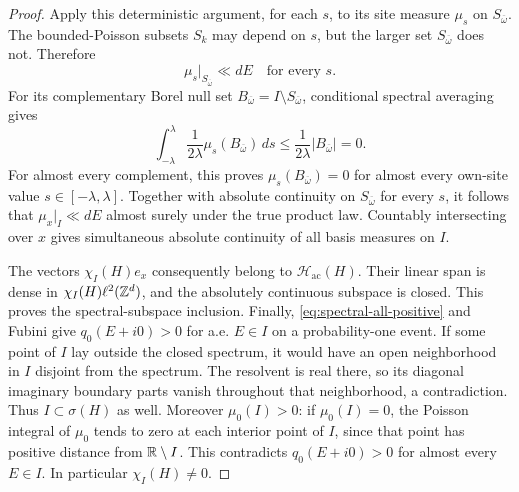 \begin{proof}
Apply this deterministic argument, for each $s$, to its site measure $\mu_s$
on $S_{\overline\omega}$. The bounded-Poisson subsets $S_k$
may depend on $s$, but the larger set $S_{\overline\omega}$
does not. Therefore
\[
 \mu_s|_{S_{\overline\omega}}\ll dE\quad\text{for every }s.
\]
For its complementary Borel null set
$B_{\overline\omega}=I\setminus S_{\overline\omega}$,
conditional spectral averaging gives
\[
 \int_{-\lambda}^{\lambda}\frac1{2\lambda}
       \mu_s(B_{\overline\omega})\,ds
 \le\frac1{2\lambda}|B_{\overline\omega}|=0.
\]
For almost every complement, this proves
$\mu_s(B_{\overline\omega})=0$ for almost every own-site value
$s\in[-\lambda,\lambda]$.
Together with absolute continuity on $S_{\overline\omega}$ for every
$s$, it follows that $\mu_x|_I\ll dE$ almost surely under the true
product law. Countably intersecting over $x$ gives simultaneous
absolute continuity of all basis measures on $I$.

The vectors $\chi_I(H)e_x$ consequently belong to
$\mathcal H_{\mathrm{ac}}(H)$. Their linear span is dense in
$\chi_I(H)\ell^2(\mathbb Z^d)$, and the absolutely continuous
subspace is closed. This proves the spectral-subspace inclusion.
Finally, \eqref{eq:spectral-all-positive} and Fubini give
$q_0(E+i0)>0$ for a.e. $E\in I$ on a probability-one event.
If some point of $I$ lay outside the closed spectrum, it would
have an open neighborhood in $I$ disjoint from the spectrum.
The resolvent is real there, so its diagonal imaginary boundary
parts vanish throughout that neighborhood, a contradiction.
Thus $I\subset\sigma(H)$ as well.
Moreover $\mu_0(I)>0$: if $\mu_0(I)=0$, the Poisson integral
of $\mu_0$ tends to zero at each interior point of $I$, since
that point has positive distance from $\mathbb R\setminus I$.
This contradicts $q_0(E+i0)>0$ for almost every $E\in I$.
In particular $\chi_I(H)\ne0$.
\end{proof}

